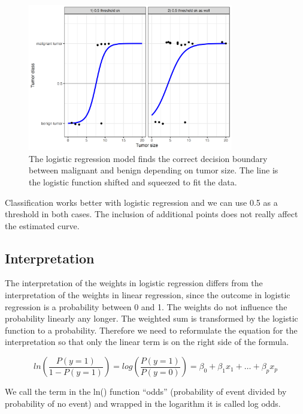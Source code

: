 \documentclass[
  10pt,
]{scrbook}
\begin{document}
\begin{figure}

{\centering \includegraphics[width=0.8\textwidth]{images/logistic-class-threshold-1} 

}

\caption{The logistic regression model finds the correct decision boundary between malignant and benign depending on tumor size. The line is the logistic function shifted and squeezed to fit the data.}\label{fig:logistic-class-threshold}
\end{figure}

Classification works better with logistic regression and we can use 0.5 as a threshold in both cases. The inclusion of additional points does not really affect the estimated curve.

\hypertarget{interpretation-1}{%
\subsection{Interpretation}\label{interpretation-1}}

The interpretation of the weights in logistic regression differs from the interpretation of the weights in linear regression, since the outcome in logistic regression is a probability between 0 and 1.
The weights do not influence the probability linearly any longer.
The weighted sum is transformed by the logistic function to a probability.
Therefore we need to reformulate the equation for the interpretation so that only the linear term is on the right side of the formula.

\[ln\left(\frac{P(y=1)}{1-P(y=1)}\right)=log\left(\frac{P(y=1)}{P(y=0)}\right)=\beta_{0}+\beta_{1}x_{1}+\ldots+\beta_{p}x_{p}\]

We call the term in the ln() function ``odds'' (probability of event divided by probability of no event) and wrapped in the logarithm it is called log odds.
\end{document}
